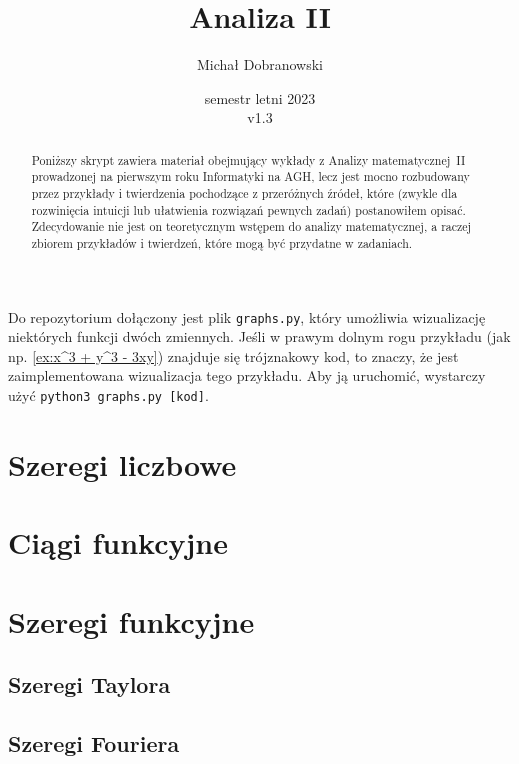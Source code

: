 \documentclass[polish,pretty]{angav}
\title{Analiza II}
\author{Michał Dobranowski}
\date{semestr letni 2023 \\ v1.3}
\begin{document}
    \maketitle
    \begin{abstract}
        \noindent Poniższy skrypt zawiera materiał obejmujący wykłady z Analizy matematycznej~II prowadzonej na pierwszym roku Informatyki na AGH, lecz jest mocno rozbudowany przez przykłady i twierdzenia pochodzące z przeróżnych źródeł, które (zwykle dla rozwinięcia intuicji lub ułatwienia rozwiązań pewnych zadań) postanowiłem opisać. Zdecydowanie nie jest on teoretycznym wstępem do analizy matematycznej, a raczej zbiorem przykładów i twierdzeń, które mogą być przydatne w zadaniach.
    \end{abstract}
    \vspace*{\fill}
    {\footnotesize\doclicenseThis}
    \newpage

    \tableofcontents
    \newpage

    Do repozytorium dołączony jest plik \texttt{graphs.py}, który umożliwia wizualizację niektórych funkcji dwóch zmiennych. Jeśli w prawym dolnym rogu przykładu (jak np. \ref{ex:x^3 + y^3 - 3xy}) znajduje się trójznakowy kod, to znaczy, że jest zaimplementowana wizualizacja tego przykładu. Aby ją uruchomić, wystarczy użyć \texttt{python3 graphs.py [kod]}.

    \section{Szeregi liczbowe}
    

    \section{Ciągi funkcyjne}
    

    \section{Szeregi funkcyjne}
    
        \subsection{Szeregi Taylora}
        
        \subsection{Szeregi Fouriera}
        
\end{document}
